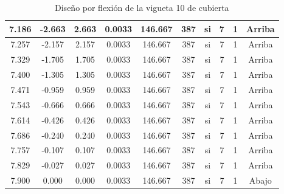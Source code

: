 \begin{table}[H]
{\begin{tabular}{|c|c|c|c|c|c|c|c|c|c|}
    \hline
    7.186 & -2.663 & 2.663 & 0.0033 & 146.667 & 387 & si  & 7   & 1   & Arriba \bigstrut\\
    \hline
    7.257 & -2.157 & 2.157 & 0.0033 & 146.667 & 387 & si  & 7   & 1   & Arriba \bigstrut\\
    \hline
    7.329 & -1.705 & 1.705 & 0.0033 & 146.667 & 387 & si  & 7   & 1   & Arriba \bigstrut\\
    \hline
    7.400 & -1.305 & 1.305 & 0.0033 & 146.667 & 387 & si  & 7   & 1   & Arriba \bigstrut\\
    \hline
    7.471 & -0.959 & 0.959 & 0.0033 & 146.667 & 387 & si  & 7   & 1   & Arriba \bigstrut\\
    \hline
    7.543 & -0.666 & 0.666 & 0.0033 & 146.667 & 387 & si  & 7   & 1   & Arriba \bigstrut\\
    \hline
    7.614 & -0.426 & 0.426 & 0.0033 & 146.667 & 387 & si  & 7   & 1   & Arriba \bigstrut\\
    \hline
    7.686 & -0.240 & 0.240 & 0.0033 & 146.667 & 387 & si  & 7   & 1   & Arriba \bigstrut\\
    \hline
    7.757 & -0.107 & 0.107 & 0.0033 & 146.667 & 387 & si  & 7   & 1   & Arriba \bigstrut\\
    \hline
    7.829 & -0.027 & 0.027 & 0.0033 & 146.667 & 387 & si  & 7   & 1   & Arriba \bigstrut\\
    \hline
    7.900 & 0.000 & 0.000 & 0.0033 & 146.667 & 387 & si  & 7   & 1   & Abajo \bigstrut\\
    \hline
    \end{tabular}%
   }%
      \caption{Diseño por flexión de la vigueta 10 de cubierta}
  \label{tab:F VT10 CUB}%
\end{table}%

